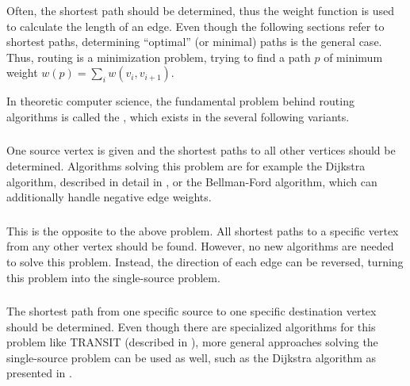 		Often, the shortest path should be determined, thus the weight function is used to calculate the length of an edge.
		Even though the following sections refer to shortest paths, determining \enquote{optimal} (or minimal) paths is the general case.
		Thus, routing is a minimization problem, trying to find a path $p$ of minimum weight $w(p) = \sum_i{w(v_i, v_{i+1})}$.
		
		In theoretic computer science, the fundamental problem behind routing algorithms is called the , which exists in the several following variants.
		
		\subsubsection{}
		\label{subsubsec:single-source-shortest-path}
		
			One source vertex is given and the shortest paths to all other vertices should be determined.
			Algorithms solving this problem are for example the Dijkstra algorithm, described in detail in , or the Bellman-Ford algorithm, which can additionally handle negative edge weights\cite[651]{cormen-introduction-to-alg}.
		
		\subsubsection{}
		
			This is the opposite to the above problem.
			All shortest paths to a specific vertex from any other vertex should be found.
			However, no new algorithms are needed to solve this problem.
			Instead, the direction of each edge can be reversed, turning this problem into the single-source problem.
		
		\subsubsection{}
		
			The shortest path from one specific source to one specific destination vertex should be determined.
			Even though there are specialized algorithms for this problem like TRANSIT (described in ), more general approaches solving the single-source problem can be used as well, such as the Dijkstra algorithm as presented in .
		
